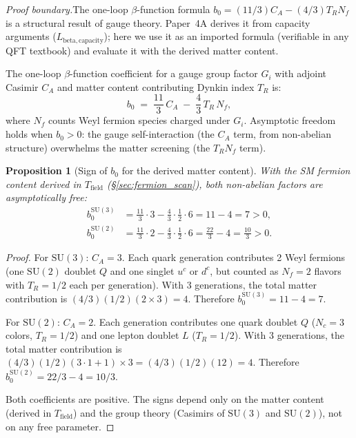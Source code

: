 \documentclass[11pt,a4paper]{article}
\newtheorem{proposition}[theorem]{Proposition}
\theoremstyle{definition}
\newcommand{\SU}{\mathrm{SU}}
\begin{document}
\textit{Proof boundary.}\quad The one-loop $\beta$-function formula
$b_0 = (11/3)C_A - (4/3)T_R N_f$ is a structural result of gauge
theory.  Paper~4A derives it from capacity arguments
($L_{\mathrm{beta,capacity}}$); here we use it as an imported formula
(verifiable in any QFT textbook) and evaluate it with the derived
matter content.

The one-loop $\beta$-function coefficient for a gauge group factor $G_i$
with adjoint Casimir $C_A$ and matter content contributing Dynkin index
$T_R$ is:
\begin{equation}
  b_0 \;=\; \frac{11}{3}\,C_A \;-\; \frac{4}{3}\,T_R\,N_f,
  \label{eq:beta_one_loop}
\end{equation}
where $N_f$ counts Weyl fermion species charged under $G_i$.
Asymptotic freedom holds when $b_0 > 0$: the gauge self-interaction
(the $C_A$ term, from non-abelian structure) overwhelms the matter
screening (the $T_R N_f$ term).

\begin{proposition}[Sign of $b_0$ for the derived matter content]
\label{prop:AF_sign}
With the SM fermion content derived in $T_{\mathrm{field}}$
(\S\ref{sec:fermion_scan}), both non-abelian factors are asymptotically
free:
\begin{align}
  b_0^{\SU(3)} &= \frac{11}{3} \cdot 3 - \frac{4}{3} \cdot \frac{1}{2} \cdot 6
    = 11 - 4 = 7 > 0, \label{eq:b0_su3} \\
  b_0^{\SU(2)} &= \frac{11}{3} \cdot 2 - \frac{4}{3} \cdot \frac{1}{2} \cdot 6
    = \frac{22}{3} - 4 = \frac{10}{3} > 0. \label{eq:b0_su2}
\end{align}
\end{proposition}

\begin{proof}
For $\SU(3)$: $C_A = 3$.  Each quark generation contributes 2 Weyl
fermions (one $\SU(2)$ doublet $Q$ and one singlet $u^c$ or $d^c$,
but counted as $N_f = 2$ flavors with $T_R = 1/2$ each per generation).
With 3 generations, the total matter contribution is
$(4/3)(1/2)(2 \times 3) = 4$.  Therefore $b_0^{\SU(3)} = 11 - 4 = 7$.

For $\SU(2)$: $C_A = 2$.  Each generation contributes one quark doublet
$Q$ ($N_c = 3$ colors, $T_R = 1/2$) and one lepton doublet $L$
($T_R = 1/2$).  With 3 generations, the total matter contribution is
$(4/3)(1/2)(3 \cdot 1 + 1) \times 3 = (4/3)(1/2)(12) = 4$.
Therefore $b_0^{\SU(2)} = 22/3 - 4 = 10/3$.

Both coefficients are positive.  The signs depend only on the matter
content (derived in $T_{\mathrm{field}}$) and the group theory
(Casimirs of $\SU(3)$ and $\SU(2)$), not on any free parameter.
\end{proof}
\end{document}
